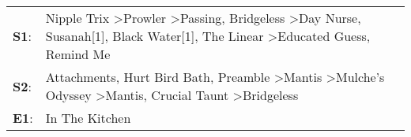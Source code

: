 \begin{supertabular}{p{0.03\textwidth}p{0.92\textwidth}}
 \textbf{S1}:  &  Nipple Trix\textsuperscript{} \textgreater \enspace Prowler\textsuperscript{} \textgreater \enspace Passing\textsuperscript{}, \enspace Bridgeless\textsuperscript{} \textgreater \enspace Day Nurse\textsuperscript{}, \enspace Susanah[1]\textsuperscript{}, \enspace Black Water[1]\textsuperscript{}, \enspace The Linear\textsuperscript{} \textgreater \enspace Educated Guess\textsuperscript{}, \enspace Remind Me\textsuperscript{}  \enspace  \\
 \textbf{S2}:  &                                                                             Attachments\textsuperscript{}, \enspace Hurt Bird Bath\textsuperscript{}, \enspace Preamble\textsuperscript{} \textgreater \enspace Mantis\textsuperscript{} \textgreater \enspace Mulche's Odyssey\textsuperscript{} \textgreater \enspace Mantis\textsuperscript{}, \enspace Crucial Taunt\textsuperscript{} \textgreater \enspace Bridgeless\textsuperscript{}  \enspace  \\
 \textbf{E1}:  &                                                                                                                                                                                                                                                                                                                                                                                                              In The Kitchen\textsuperscript{}  \enspace  \\
\end{supertabular}
